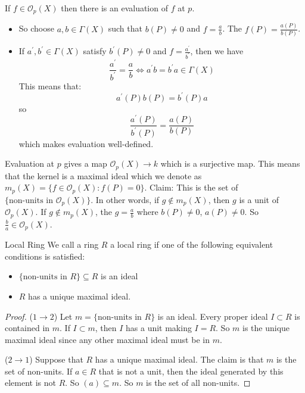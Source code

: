 \documentclass{report}
\begin{document}
If $f \in \mathcal{O}_{p}(X)$ then there is an evaluation of $f$ at $p$.
    \begin{itemize}
        \item So choose $a, b \in \Gamma(X)$ such that $b(P) \neq 0$ and $f = \frac{a}{b}$. The $f(P) = \frac{a(P)}{b(P)}$.


        \item If $a^{\prime}, b^{\prime} \in \Gamma(X)$ satisfy $b^{\prime}(P) \neq 0$ and $f = \frac{a^{\prime}}{b^{\prime}}$, then we have
            \begin{equation*}
                \dfrac{a^{\prime}}{b^{\prime}} = \dfrac{a}{b} \iff a^{\prime}b = b^{\prime}a \in \Gamma(X)
            \end{equation*}
        This means that:
            \begin{equation*}
                a^{\prime}(P)b(P) = b^{\prime}(P)a
            \end{equation*}
        so 
            \begin{equation*}
                \dfrac{a^{\prime}(P)}{b^{\prime}(P)} = \dfrac{a(P)}{b(P)}
            \end{equation*}
        which makes evaluation well-defined.
    \end{itemize}

Evaluation at $p$ gives a map $\mathcal{O}_{p}(X) \rightarrow k$ which is a surjective map. This means that the kernel is a maximal ideal which we denote as $m_{p}(X) = \{f \in \mathcal{O}_{p}(X) : f(P) = 0\}$. Claim: This is the set of $\{\text{non-units in $\mathcal{O}_{p}(X)$}\}$. In other words, if $g \notin m_{p}(X)$, then $g$ is a unit of $\mathcal{O}_{p}(X)$. If $g \notin m_{p}(X)$, the $g = \frac{a}{b}$ where $b(P) \neq 0$, $a(P) \neq 0$. So $\frac{b}{a} \in \mathcal{O}_{p}(X)$.

\begin{definition}{Local Ring}
    We call a ring $R$ a local ring if one of the following equivalent conditions is satisfied:
        \begin{itemize}
            \item  $\{\text{non-units in $R$}\} \subseteq R$ is an ideal

            \item  $R$ has a unique maximal ideal. 
        \end{itemize}
\end{definition}
    \begin{proof}
        ($1 \rightarrow 2$) Let $m = \{\text{non-units in $R$}\}$ is an ideal. Every proper ideal $I \subset R$ is contained in $m$. If $I \subset m$, then $I$ has a unit making $I = R$. So $m$ is the unique maximal ideal since any other maximal ideal must be in $m$.

        ($2 \rightarrow 1$) Suppose that $R$ has a unique maximal ideal. The claim is that $m$ is the set of non-units. If $a \in R$ that is not a unit, then the ideal generated by this element is not $R$. So $(a) \subseteq m$. So $m$ is the set of all non-units.
    \end{proof}
\end{document}

